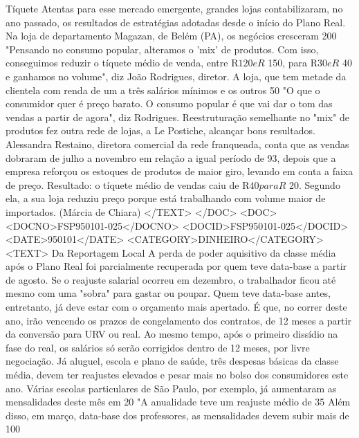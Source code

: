 Tíquete 
Atentas para esse mercado emergente, grandes lojas contabilizaram, no ano passado, os resultados de estratégias adotadas desde o início do Plano Real.
Na loja de departamento Magazan, de Belém (PA), os negócios cresceram 200%
"Pensando no consumo popular, alteramos o 'mix' de produtos. Com isso, conseguimos reduzir o tíquete médio de venda, entre R$ 120 e R$ 150, para R$ 30 e R$ 40 e ganhamos no volume", diz João Rodrigues, diretor.
A loja, que tem metade da clientela com renda de um a três salários mínimos e os outros 50%
"O que o consumidor quer é preço barato. O consumo popular é que vai dar o tom das vendas a partir de agora", diz Rodrigues.
Reestruturação semelhante no "mix" de produtos fez outra rede de lojas, a Le Postiche, alcançar bons resultados.
Alessandra Restaino, diretora comercial da rede franqueada, conta que as vendas dobraram de julho a novembro em relação a igual período de 93, depois que a empresa reforçou os estoques de produtos de maior giro, levando em conta a faixa de preço.
Resultado: o tíquete médio de vendas caiu de R$ 40 para R$ 20.
Segundo ela, a sua loja reduziu preço porque está trabalhando com volume maior de importados.
(Márcia de Chiara)
</TEXT>
</DOC>
<DOC>
<DOCNO>FSP950101-025</DOCNO>
<DOCID>FSP950101-025</DOCID>
<DATE>950101</DATE>
<CATEGORY>DINHEIRO</CATEGORY>
<TEXT>
Da Reportagem Local 
A perda de poder aquisitivo da classe média após o Plano Real foi parcialmente recuperada por quem teve data-base a partir de agosto. Se o reajuste salarial ocorreu em dezembro, o trabalhador ficou até mesmo com uma "sobra" para gastar ou poupar.
Quem teve data-base antes, entretanto, já deve estar com o orçamento mais apertado. É que, no correr deste ano, irão vencendo os prazos de congelamento dos contratos, de 12 meses a partir da conversão para URV ou real.
Ao mesmo tempo, após o primeiro dissídio na fase do real, os salários só serão corrigidos dentro de 12 meses, por livre negociação.
Já aluguel, escola e plano de saúde, três despesas básicas da classe média, devem ter reajustes elevados e pesar mais no bolso dos consumidores este ano.
Várias escolas particulares de São Paulo, por exemplo, já aumentaram as mensalidades deste mês em 20%
"A anualidade teve um reajuste médio de 35%
Além disso, em março, data-base dos professores, as mensalidades devem subir mais de 100%

